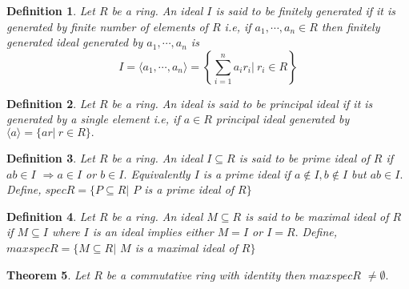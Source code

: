 \documentclass[11pt]{amsart}
\newtheorem{theorem}{Theorem}[section]
\newtheorem{definition}[theorem]{Definition}%
\begin{document}
\begin{definition}
Let $R$ be a ring. An ideal $I$ is said to be finitely generated if it is generated by finite number of elements of $R$ i.e, if $a_1,\cdots ,a_n\in R$ then finitely generated ideal generated by $a_1,\cdots ,a_n$ is $$I=\langle a_1,\cdots ,a_n\rangle=\left\lbrace \displaystyle\sum_{i=1}^n a_ir_i|~r_i\in R\right\rbrace $$
\end{definition}



\begin{definition}
Let $R$ be a ring. An ideal is said to be principal ideal if it is generated by a single element i.e, if $a\in R$ principal ideal generated by $\langle a\rangle=\{ar|~r\in R\}.$
\end{definition}
\begin{definition}
Let $R$ be a ring. An ideal $I\subseteq R$ is said to be prime ideal of $R$ if $ab\in I$ $\Rightarrow a\in I$ or $b \in I.$ Equivalently $I$ is a prime ideal if $a \notin I, b\notin I$ but $ab\in I.$
\newline Define, $specR=\{P\subseteq R|$ $P$ is a prime ideal of $R \}$ 
\end{definition}
\begin{definition}
Let $R$ be a ring. An ideal $M\subseteq R$ is said to be maximal ideal of $R$ if $M\subseteq I$ where $I$ is an ideal implies either $M=I$ or $I=R.$
\newline Define, $maxspecR=\{M\subseteq R|$ $M$ is a maximal ideal of $R \}$ 
\end{definition}
\begin{theorem}
Let $R$ be a commutative ring with identity then $maxspecR$ $\neq \emptyset.$
\end{theorem}
\end{document}
